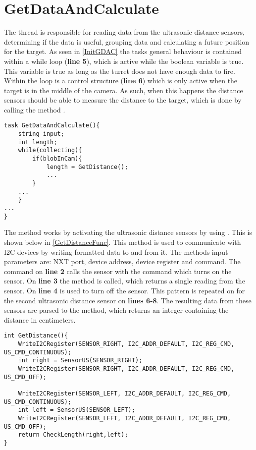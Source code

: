 \section{GetDataAndCalculate}
The thread  is responsible for reading data
from the ultrasonic distance sensors, determining if the data is useful,
grouping data and calculating a future position for the target. As seen in
\autoref{InitGDAC} the tasks general behaviour is contained within a while loop
(\textbf{line 5}), which is active while the boolean variable
 is true. This variable is true as long as the
turret does not have enough data to fire. Within the loop is a control structure
(\textbf{line 6}) which is only active when the target is in the middle of the
camera. As such, when this happens the distance sensors should be able to
measure the distance to the target, which is done by calling the method
.

\begin{minipage}[H]{\linewidth}
\begin{lstlisting}[caption = General behaviour for GetDataAndCalculate, label = InitGDAC] 
task GetDataAndCalculate(){
    string input;
    int length;
    while(collecting){
        if(blobInCam){
            length = GetDistance();
            ...
        }
    ...
    }
...
}
\end{lstlisting}
\end{minipage}

The  method works by activating the ultrasonic distance
sensors by using . This is shown below in
\autoref{GetDistanceFunc}. This method is used to communicate with I2C devices
by writing formatted data to and from it. The methods input parameters are: NXT
port, device address, device register and command. The command on \textbf{line
2} calls the sensor with the command  which turns on
the sensor. On \textbf{line 3} the  method is called, which
returns a single reading from the sensor. On \textbf{line 4}
 is used to turn off the sensor. This pattern is repeated on
for the second ultrasonic distance sensor on \textbf{lines 6-8}. The resulting
data from these sensors are parsed to the  method, which
returns an integer containing the distance in centimeters.

\begin{minipage}[H]{\linewidth}
\begin{lstlisting}[caption = Method for reading the distance from the ultrasonic distance sensors., label = GetDistanceFunc] 
int GetDistance(){
    WriteI2CRegister(SENSOR_RIGHT, I2C_ADDR_DEFAULT, I2C_REG_CMD, US_CMD_CONTINUOUS);
    int right = SensorUS(SENSOR_RIGHT);
    WriteI2CRegister(SENSOR_RIGHT, I2C_ADDR_DEFAULT, I2C_REG_CMD, US_CMD_OFF);

    WriteI2CRegister(SENSOR_LEFT, I2C_ADDR_DEFAULT, I2C_REG_CMD, US_CMD_CONTINUOUS);
    int left = SensorUS(SENSOR_LEFT);
    WriteI2CRegister(SENSOR_LEFT, I2C_ADDR_DEFAULT, I2C_REG_CMD, US_CMD_OFF);
    return CheckLength(right,left);
}
\end{lstlisting}
\end{minipage}

